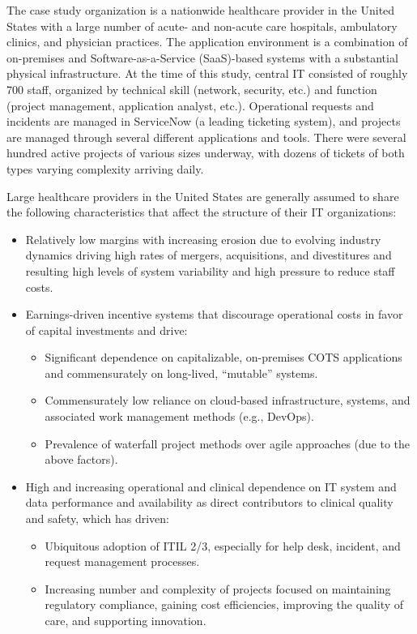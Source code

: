 \documentclass[conference]{IEEEtran}
\begin{document}
The case study organization is a nationwide healthcare provider in the United States with a large number of acute- and non-acute care hospitals, ambulatory clinics, and physician practices. The application environment is a combination of on-premises and Software-as-a-Service (SaaS)-based systems with a substantial physical infrastructure. At the time of this study, central IT consisted of roughly 700 staff, organized by technical skill (network, security, etc.) and function (project management, application analyst, etc.). Operational requests and incidents are managed in ServiceNow (a leading ticketing system), and projects are managed through several different applications and tools. There were several hundred active projects of various sizes underway, with dozens of tickets of both types varying complexity arriving daily.

Large healthcare providers in the United States are generally assumed to share the following characteristics that affect the structure of their IT organizations:

\begin{itemize}
\item Relatively low margins with increasing erosion due to evolving industry dynamics driving high rates of mergers, acquisitions, and divestitures and resulting high levels of system variability and high pressure to reduce staff costs.
\item Earnings-driven incentive systems that discourage operational costs in favor of capital investments and drive:
    \begin{itemize}
    \item Significant dependence on capitalizable, on-premises COTS applications and commensurately on long-lived, ``mutable'' systems.
    \item Commensurately low reliance on cloud-based infrastructure, systems, and associated work management methods (e.g., DevOps).
    \item Prevalence of waterfall project methods over agile approaches (due to the above factors).
    \end{itemize}
\item High and increasing operational and clinical dependence on IT system and data performance and availability as direct contributors to clinical quality and safety, which has driven:
    \begin{itemize}
    \item Ubiquitous adoption of ITIL 2/3, especially for help desk, incident, and request management processes.
    \item Increasing number and complexity of projects focused on maintaining regulatory compliance, gaining cost efficiencies, improving the quality of care, and supporting innovation.
    \end{itemize}
\end{itemize}
\end{document}
